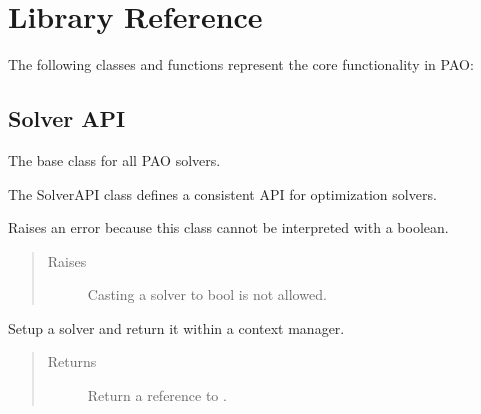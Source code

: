 \documentclass[letterpaper,10pt,english]{sphinxmanual}
\begin{document}
\section{Library Reference}
\label{\detokenize{reference:library-reference}}\label{\detokenize{reference::doc}}
The following classes and functions represent the core functionality
in PAO:


\subsection{Solver API}
\label{\detokenize{reference/solverapi:solver-api}}\label{\detokenize{reference/solverapi::doc}}

\begin{fulllineitems}
\label{\detokenize{reference/solverapi:pao.common.solver.SolverAPI}}
The base class for all PAO solvers.

The SolverAPI class defines a consistent API for optimization solvers.

\begin{fulllineitems}
\label{\detokenize{reference/solverapi:pao.common.solver.SolverAPI.__bool__}}
Raises an error because this class cannot be interpreted with a boolean.
\begin{quote}\begin{description}
\item[{Raises}] \leavevmode
{} \textendash{} Casting a solver to bool is not allowed.

\end{description}\end{quote}

\end{fulllineitems}


\begin{fulllineitems}
\label{\detokenize{reference/solverapi:pao.common.solver.SolverAPI.__enter__}}
Setup a solver and return it within a context manager.
\begin{quote}\begin{description}
\item[{Returns}] \leavevmode
Return a reference to .


\end{description}
\end{quote}
\end{fulllineitems}
\end{fulllineitems}
\end{document}
